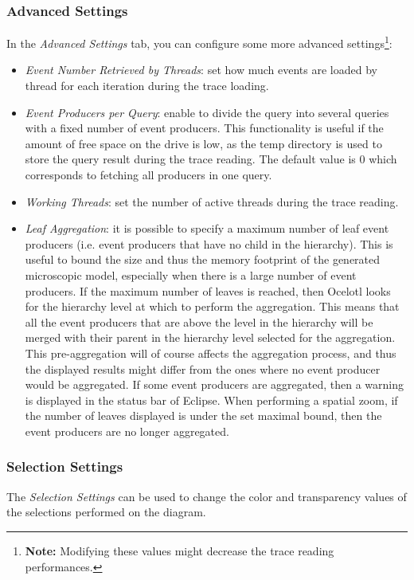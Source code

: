 \documentclass[twoside]{article}
\begin{document}
\begin{sloppypar}
\subsubsection{Advanced Settings}
In the \textit{Advanced Settings} tab, you can configure some more advanced settings\footnote{\textbf{Note:} Modifying these values might decrease the trace reading performances.}:
\begin{itemize}
	\item \textit{Event Number Retrieved by Threads}: set how much events are loaded by thread for each iteration during the trace loading.
	\item \textit{Event Producers per Query}: enable to divide the query into several queries with a fixed number of event producers. This functionality is useful if the amount of free space on the drive is low, as the temp directory is used to store the query result during the trace reading. The default value is 0 which corresponds to fetching all producers in one query.
	\item \textit{Working Threads}: set the number of active threads during the trace reading. 
	\item \textit{Leaf Aggregation}: it is possible to specify a maximum number of leaf event producers (i.e. event producers that have no child in the hierarchy). This is useful to bound the size and thus the memory footprint of the generated microscopic model, especially when there is a large number of event producers. If the maximum number of leaves is reached, then Ocelotl looks for the hierarchy level at which to perform the aggregation. This means that all the event producers that are above the level in the hierarchy will be merged with their parent in the hierarchy level selected for the aggregation. This pre-aggregation will of course affects the aggregation process, and thus the displayed results might differ from the ones where no event producer would be aggregated. If some event producers are aggregated, then a warning is displayed in the status bar of Eclipse. When performing a spatial zoom, if the number of leaves displayed is under the set maximal bound, then the event producers are no longer aggregated.
\end{itemize}

\subsubsection{Selection Settings}
The \textit{Selection Settings} can be used to change the color and transparency values of the selections performed on the diagram.


\end{sloppypar}
\end{document}

